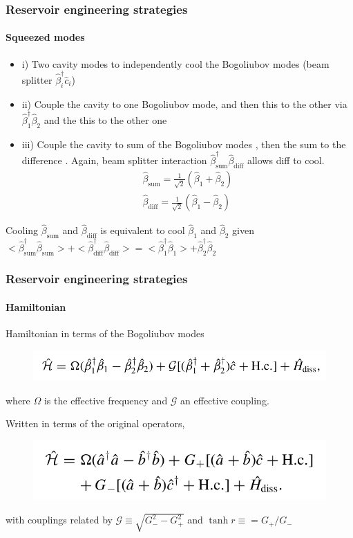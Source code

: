 \documentclass[aspectratio=43]{beamer}
\begin{document}
\begin{frame}
	
	\frametitle{Reservoir engineering strategies}
	\framesubtitle{Squeezed modes}
	
	\begin{itemize}
		\item i) Two cavity modes to independently cool the Bogoliubov modes (beam splitter $\hat{\beta}^{\dagger}_{i} \hat{c}_{i}$)
		\item ii) Couple the cavity to one Bogoliubov mode, and then this to the other via $\hat{\beta}^{\dagger}_{1} \hat{\beta}_{2}$ and the this to the other one
		\item iii) Couple the cavity to sum of the Bogoliubov modes , then the sum to the difference . Again, beam splitter interaction $\hat{\beta}^{\dagger}_{\textrm{sum}} \hat{\beta}_{\textrm{diff}}$ allows diff to cool.
		\begin{align}
			\hat{\beta}_{\textrm{sum}} = \frac{1}{\sqrt{2}}(\hat{\beta}_{1} + \hat{\beta}_{2}) \nonumber \\
			\hat{\beta}_{\textrm{diff}} = \frac{1}{\sqrt{2}}(\hat{\beta}_{1} - \hat{\beta}_{2}) \nonumber
		\end{align}
	\end{itemize}

	Cooling $\hat{\beta}_{\textrm{sum}}$ and $\hat{\beta}_{\textrm{diff}}$ is equivalent to cool $\hat{\beta}_{1}$ and $\hat{\beta}_{2}$ given $<\hat{\beta}^{\dagger}_{\textrm{sum}} \hat{\beta}_{\textrm{sum}}> + <\hat{\beta}^{\dagger}_{\textrm{diff}} \hat{\beta}_{\textrm{diff}}> = <\hat{\beta}^{\dagger}_{1} \hat{\beta}_{1}> + \hat{\beta}^{\dagger}_{2} \hat{\beta}_{2}$

\end{frame}

\begin{frame}
	
	\frametitle{Reservoir engineering strategies}
	\framesubtitle{Hamiltonian}
	
	Hamiltonian in terms of the Bogoliubov modes
	\begin{figure}
		\includegraphics[width = 8.5 cm]{plots/hamiltonian_3.png}
	\end{figure}	
	
	where $\Omega$ is the effective frequency and $\mathcal{G}$ an effective coupling.
	
	Written in terms of the original operators,
	\begin{figure}
		\includegraphics[width = 7.5 cm]{plots/hamiltonian_4.png}
	\end{figure}

	with couplings related by $\mathcal{G} \equiv \sqrt{G_{-}^{2} - G_{+}^{2}}$ and $\tanh r \equiv = G_{+}/G_{-}$

\end{frame}
\end{document}
